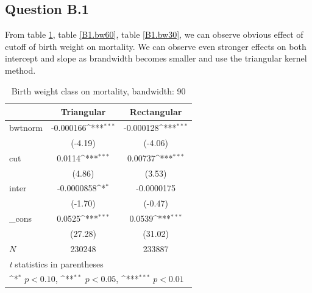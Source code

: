 \documentclass[a4paper,11pt]{article}
\begin{document}
\subsection*{Question B.1}

From table \ref{B1.bw90}, table \ref{B1.bw60}, table \ref{B1.bw30}, we can observe obvious effect of cutoff of birth weight on mortality. We can observe even stronger effects on both intercept and slope as brandwidth becomes smaller and use the triangular kernel method.


\begin{table}[htbp]\centering
\def\sym#1{\ifmmode^{#1}\else\(^{#1}\)\fi}
\caption{Birth weight class on mortality, bandwidth: 90}
\label{B1.bw90}
\begin{tabular}{l*{2}{c}}
\hline\hline
            &\multicolumn{1}{c}{Triangular}&\multicolumn{1}{c}{Rectangular}\\
\hline
bwtnorm     &   -0.000166\sym{***}&   -0.000128\sym{***}\\
            &     (-4.19)         &     (-4.06)         \\
[1em]
cut         &      0.0114\sym{***}&     0.00737\sym{***}\\
            &      (4.86)         &      (3.53)         \\
[1em]
inter       &  -0.0000858\sym{*}  &  -0.0000175         \\
            &     (-1.70)         &     (-0.47)         \\
[1em]
\_cons      &      0.0525\sym{***}&      0.0539\sym{***}\\
            &     (27.28)         &     (31.02)         \\
\hline
\(N\)       &      230248         &      233887         \\
\hline\hline
\multicolumn{3}{l}{\footnotesize \textit{t} statistics in parentheses}\\
\multicolumn{3}{l}{\footnotesize \sym{*} \(p<0.10\), \sym{**} \(p<0.05\), \sym{***} \(p<0.01\)}\\
\end{tabular}
\end{table}


\end{document}
